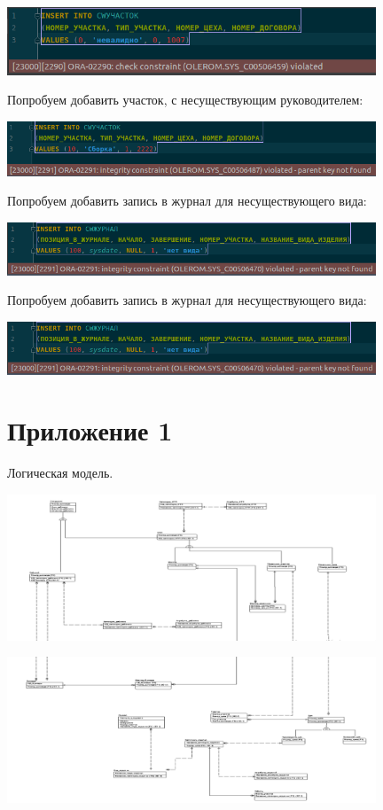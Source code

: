 \includegraphics[width=11cm]{./screenshots/constraints/field_type.png}

Попробуем добавить участок, с несуществующим руководителем:

\includegraphics[width=11cm]{./screenshots/constraints/field.png}

Попробуем добавить запись в журнал для несуществующего вида:

\includegraphics[width=11cm]{./screenshots/constraints/list.png}

Попробуем добавить запись в журнал для несуществующего вида:

\includegraphics[width=11cm]{./screenshots/constraints/list.png}

\section{Приложение 1}

    Логическая модель.

    \includegraphics[width=11cm]{./screenshots/model/logical1.png}

    \includegraphics[width=11cm]{./screenshots/model/logical2.png}

